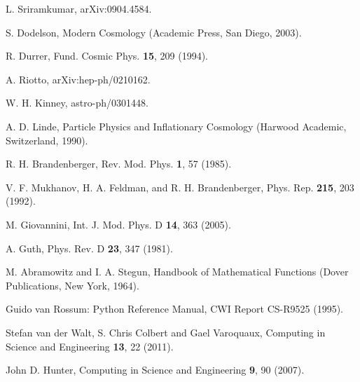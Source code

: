 \documentclass[12pt,a4paper,oneside]{book}
\begin{document}
\begin{thebibliography}{99}

L. Sriramkumar, arXiv:0904.4584.

S. Dodelson, Modern Cosmology (Academic Press, San Diego, 2003).

R. Durrer, Fund. Cosmic Phys. {\bf 15}, 209 (1994).

A. Riotto, arXiv:hep-ph/0210162.

W. H. Kinney, astro-ph/0301448.

A. D. Linde, Particle Physics and Inflationary Cosmology (Harwood Academic, Switzerland, 1990).

R. H. Brandenberger, Rev. Mod. Phys. {\bf 1}, 57 (1985).

V. F. Mukhanov, H. A. Feldman, and R. H. Brandenberger, Phys. Rep. {\bf 215}, 203 (1992).

M. Giovannini, Int. J. Mod. Phys. D {\bf 14}, 363 (2005).

A. Guth, Phys. Rev. D {\bf 23}, 347 (1981).

M. Abramowitz and I. A. Stegun, Handbook of Mathematical Functions (Dover Publications, New York, 1964).

Guido van Rossum: Python Reference Manual, CWI Report CS-R9525 (1995).

Stefan van der Walt, S. Chris Colbert and Gael Varoquaux, Computing in Science and Engineering {\bf 13}, 22 (2011).

John D. Hunter, Computing in Science and Engineering {\bf 9}, 90 (2007).


\end{thebibliography}
\end{document}

